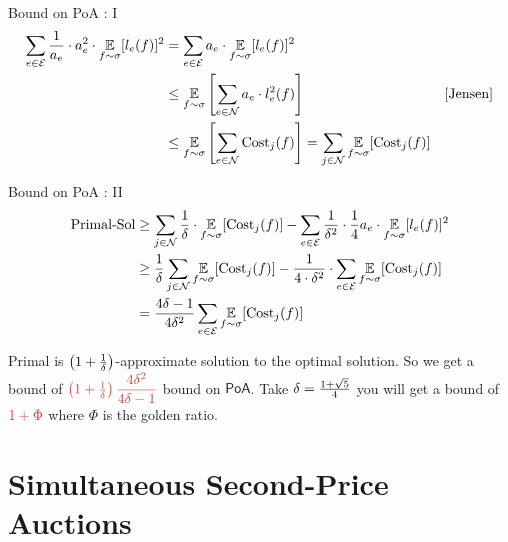 \documentclass[aspectratio=1610]{beamer}
\begin{document}
\begin{frame}{Bound on \textsf{PoA} : I}
    \vspace*{-8mm}
    \begin{align*}
        \sum_{e\in \mathcal{E}} \frac1{ a_e}\cdot a_e^2\cdot \underset{f\sim \sigma}{\mathbb{E}}[l_e(f)]^2 & = \sum_{e\in \mathcal{E}}  a_e\cdot\underset{f\sim \sigma}{\mathbb{E}}[l_e(f)]^2 \\
        & \leq \underset{f\sim \sigma}{\mathbb{E}}\left[ \sum_{e\in\mathcal{N}} a_e\cdot l_e^2(f)  \right]& [\text{Jensen}]\\
        & \leq \underset{f\sim \sigma}{\mathbb{E}}\left[ \sum_{e\in\mathcal{N}} \text{Cost}_j(f)\right] =\sum_{j\in\mathcal{N}}\underset{f\sim \sigma}{\mathbb{E}}[\text{Cost}_j(f)]
    \end{align*}
\end{frame}
\begin{frame}{Bound on \textsf{PoA} : II}
    \begin{align*}
        \text{Primal-Sol} & \geq \sum\limits_{j\in \mathcal{N}}\frac1{\delta}\cdot \underset{f\sim \sigma}{\mathbb{E}}[\text{Cost}_j(f)]-\sum_{e\in \mathcal{E}}\frac1{\delta^2}\cdot \frac1{4}a_e\cdot \underset{f\sim \sigma}{\mathbb{E}}[l_e(f)]^2\\
        & \geq  \frac{1}{\delta}\sum_{j\in\mathcal{N}}\underset{f\sim \sigma}{\mathbb{E}}[\text{Cost}_j(f)]-\frac1{4\cdot \delta^2}\cdot \sum_{e\in \mathcal{E}}\underset{f\sim \sigma}{\mathbb{E}}[\text{Cost}_j(f)]\\
        & = \frac{4\delta-1}{4\delta^2}\sum_{e\in \mathcal{E}}\underset{f\sim \sigma}{\mathbb{E}}[\text{Cost}_j(f)]
    \end{align*}\pause

Primal is $\left(1+\frac1{\delta}\right)$-approximate solution to the optimal solution. So we get a bound of $\mathcolor{myr}{\lt(1+\frac1{\dl}\rt)\dfrac{4\dl^2}{4\dl-1}}$ bound on $\textsf{PoA}$.  Take $\delta=\frac{1+\sqrt{5}}{4}$ you will get a bound of $\mathcolor{myr}{1+\Phi}$ where $\Phi$ is the golden ratio.
\end{frame}

\section{Simultaneous Second-Price Auctions}






\end{document}
